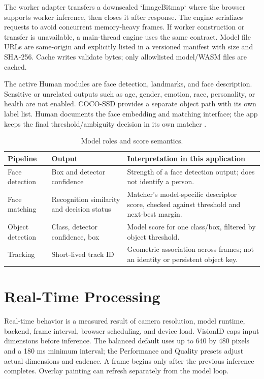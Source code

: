 \documentclass[11pt,oneside,openany]{report}
\begin{document}
The worker adapter transfers a downscaled `ImageBitmap` where the browser supports worker inference, then closes it after response. The engine serializes requests to avoid concurrent memory-heavy frames. If worker construction or transfer is unavailable, a main-thread engine uses the same contract. Model file URLs are same-origin and explicitly listed in a versioned manifest with size and SHA-256. Cache writes validate bytes; only allowlisted model/WASM files are cached.

The active Human modules are face detection, landmarks, and face description. Sensitive or unrelated outputs such as age, gender, emotion, race, personality, or health are not enabled. COCO-SSD provides a separate object path with its own label list. Human documents the face embedding and matching interface; the app keeps the final threshold/ambiguity decision in its own matcher \cite{humanEmbedding,humanModels}.

\begin{table}[htbp]
\centering
\caption{Model roles and score semantics.}
\begin{tabularx}{\textwidth}{>{\raggedright\arraybackslash}p{}XX}
\toprule
\textbf{Pipeline} & \textbf{Output} & \textbf{Interpretation in this application} \\
\midrule
Face detection & Box and detector confidence & Strength of a face detection output; does not identify a person. \\
Face matching & Recognition similarity and decision status & Matcher's model-specific descriptor score, checked against threshold and next-best margin. \\
Object detection & Class, detector confidence, box & Model score for one class/box, filtered by object threshold. \\
Tracking & Short-lived track ID & Geometric association across frames; not an identity or persistent object key. \\
\bottomrule
\end{tabularx}
\end{table}

\chapter{Real-Time Processing}
Real-time behavior is a measured result of camera resolution, model runtime, backend, frame interval, browser scheduling, and device load. VisionID caps input dimensions before inference. The balanced default uses up to 640 by 480 pixels and a 180 ms minimum interval; the Performance and Quality presets adjust actual dimensions and cadence. A frame begins only after the previous inference completes. Overlay painting can refresh separately from the model loop.
\end{document}
